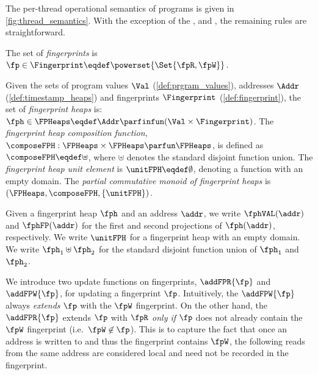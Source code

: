 The per-thread operational semantics of programs is given in \fig\ref{fig:thread_semantics}.
With the exception of the ,  and , the remaining rules are straightforward.



\begin{defn}[Fingerprints]
\label{def:fingerprint}
The set of \emph{fingerprints} is $\fp \in \Fingerprint \eqdef \powerset{\Set{\fpR,\fpW}}$.
\end{defn}
 
\begin{defn}
\label{def:fingerprint_heaps}
Given the sets of program values $\Val$ (\ref{def:prgram_values}), addresses $\Addr$ (\ref{def:timestamp_heaps}) and fingerprints $\Fingerprint$ (\ref{def:fingerprint}), the set of \emph{fingerprint heaps} is: $\fph \in \FPHeaps \eqdef \Addr \parfinfun (\Val \times \Fingerprint)$.
The \emph{fingerprint heap composition function}, $\composeFPH: \FPHeaps \times \FPHeaps \parfun \FPHeaps$, is defined as $\composeFPH \eqdef \uplus$, where $\uplus$ denotes the standard disjoint function union. The \emph{fingerprint heap unit element} is $\unitFPH \eqdef \emptyset$, denoting a function with an empty domain.
The \emph{partial commutative monoid of fingerprint heaps} is $(\FPHeaps, \composeFPH, \{\unitFPH\})$.  
\end{defn}
 
Given a fingerprint heap $\fph$ and an address $\addr$, we write $\fphVAL(\addr)$ and $\fphFP(\addr)$ for the first and second projections of $\fph(\addr)$, respectively. We write $\unitFPH$ for a fingerprint heap with an empty domain. We write $\fph_1 \uplus \fph_2$ for the standard disjoint function union of $\fph_1$ and $\fph_2$. 

We introduce two update functions on fingerprints, $\addFPR{\fp}$ and $\addFPW{\fp}$, for updating a fingerprint $\fp$. Intuitively, the $\addFPW{\fp}$ always \emph{extends} $\fp$ with the $\fpW$ fingerprint. On the other hand, the $\addFPR{\fp}$ extends $\fp$ with $\fpR$ \emph{only if} $\fp$ does not already contain the $\fpW$ fingerprint (i.e.~$\fpW \not\in \fp$). This is to capture the fact that once an address is written to and thus the fingerprint contains $\fpW$, the following reads from the same address are considered local and need not be recorded in the fingerprint.
 
